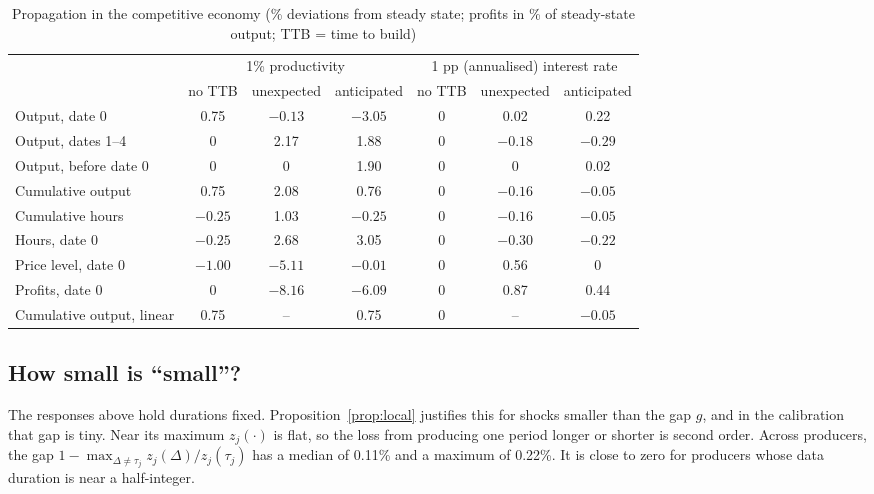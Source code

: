 \documentclass[11pt]{article}
\theoremstyle{definition}
\begin{document}
\begin{table}[h]
  \centering
  \caption{Propagation in the competitive economy (\% deviations from steady state; profits in \% of steady-state output; TTB = time to build)}\label{tab:prop}
  \small\setlength{\tabcolsep}{4pt}
  \begin{tabular}{lcccccc}
    \toprule
    & \multicolumn{3}{c}{1\% productivity} & \multicolumn{3}{c}{1 pp (annualised) interest rate} \\
    \cmidrule(lr){2-4}\cmidrule(lr){5-7}
    & no TTB & unexpected & anticipated & no TTB & unexpected & anticipated \\
    \midrule
    Output, date 0           & 0.75 & $-0.13$ & $-3.05$ & 0 & 0.02 & 0.22 \\
    Output, dates 1--4        & 0    & 2.17    & 1.88    & 0 & $-0.18$ & $-0.29$ \\
    Output, before date 0     & 0    & 0       & 1.90    & 0 & 0 & 0.02 \\
    Cumulative output         & 0.75 & 2.08    & 0.76    & 0 & $-0.16$ & $-0.05$ \\
    Cumulative hours          & $-0.25$ & 1.03 & $-0.25$ & 0 & $-0.16$ & $-0.05$ \\
    Hours, date 0             & $-0.25$ & 2.68 & 3.05    & 0 & $-0.30$ & $-0.22$ \\
    Price level, date 0       & $-1.00$ & $-5.11$ & $-0.01$ & 0 & 0.56 & 0 \\
    Profits, date 0           & 0 & $-8.16$ & $-6.09$ & 0 & 0.87 & 0.44 \\
    \midrule
    Cumulative output, linear & 0.75 & -- & 0.75 & 0 & -- & $-0.05$ \\
    \bottomrule
  \end{tabular}
\end{table}

\subsection{How small is ``small''?}\label{sec:howsmall}

The responses above hold durations fixed. Proposition~\ref{prop:local} justifies this for shocks
smaller than the gap $g$, and in the calibration that gap is tiny. Near its maximum $z_j(\cdot)$ is
flat, so the loss from producing one period longer or shorter is second order. Across producers,
the gap $1-\max_{\Delta\neq\tau_j}z_j(\Delta)/z_j(\tau_j)$ has a median of 0.11\% and a maximum of
0.22\%. It is close to zero for producers whose data duration is near a half-integer.
\end{document}
